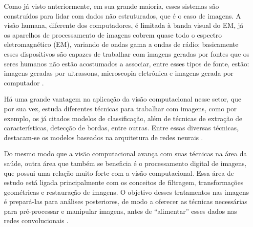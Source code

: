 Como já visto anteriormente, em sua grande maioria, esses sistemas são construídos para lidar com dados não estruturados, que é o caso de imagens. A visão humana, diferente dos computadores, é limitada à banda visual do \ac{EM}, já os aparelhos de processamento de imagens cobrem quase todo o espectro eletromagnético (EM), variando de ondas gama a ondas de rádio; basicamente esses dispositivos são capazes de trabalhar com imagens geradas por fontes que os seres humanos não estão acostumados a associar, entre esses tipos de fonte, estão: imagens geradas por ultrassons, microscopia eletrônica e imagens gerada por computador \cite{gonzalez2008digital}. 


Há uma grande vantagem na aplicação da visão computacional nesse setor, que por sua vez, estuda diferentes técnicas para trabalhar com imagens, como por exemplo, os já citados modelos de classificação, além de técnicas de extração de características, detecção de bordas, entre outras. Entre essas diversas técnicas, destacam-se os modelos baseados na arquitetura de redes neurais \cite{DOI2007198}.


Do mesmo modo que a visão computacional avança com suas técnicas na área da saúde, outra área que também se beneficia é o processamento digital de imagens, que possui uma relação muito forte com a visão computacional. Essa área de estudo está ligada principalmente com os conceitos de filtragem, transformações geométricas e restauração de imagens. O objetivo desses tratamentos nas imagens é prepará-las para análises posteriores, de modo a oferecer as técnicas necessárias para pré-processar e manipular imagens, antes de “alimentar” esses dados nas redes convolucionais \cite{gonzalez2008digital}.


